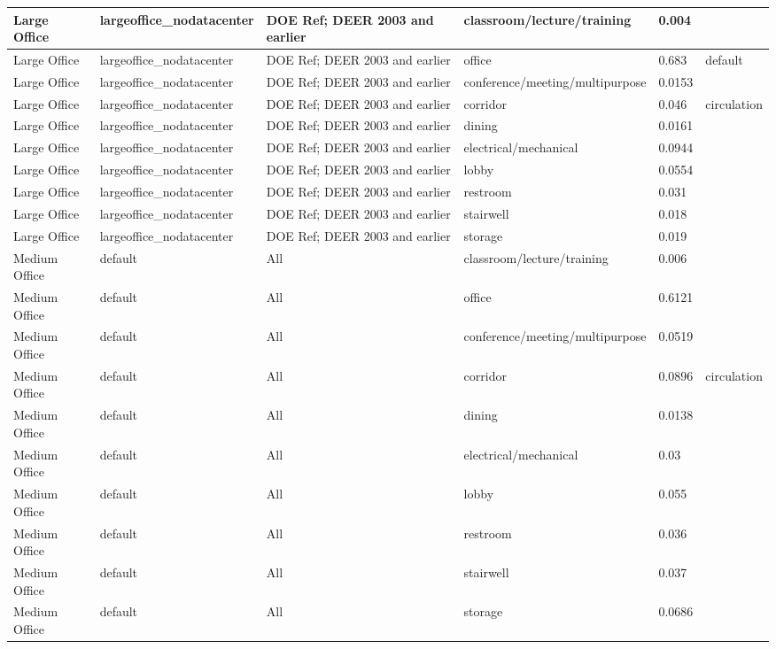 \begin{center}
\begin{longtable}{|p{1.0in}|p{1.05in}|p{1.1in}|p{1.9in}|p{0.55in}|p{0.95in}|}
Large Office & largeoffice\_nodatacenter & DOE Ref; DEER 2003 and earlier & classroom/lecture/training & 0.004 &  \\ \hline
Large Office & largeoffice\_nodatacenter & DOE Ref; DEER 2003 and earlier & office & 0.683 & default \\ \hline
Large Office & largeoffice\_nodatacenter & DOE Ref; DEER 2003 and earlier & conference/meeting/multipurpose & 0.0153 &  \\ \hline
Large Office & largeoffice\_nodatacenter & DOE Ref; DEER 2003 and earlier & corridor & 0.046 & circulation \\ \hline
Large Office & largeoffice\_nodatacenter & DOE Ref; DEER 2003 and earlier & dining & 0.0161 &  \\ \hline
Large Office & largeoffice\_nodatacenter & DOE Ref; DEER 2003 and earlier & electrical/mechanical & 0.0944 &  \\ \hline
Large Office & largeoffice\_nodatacenter & DOE Ref; DEER 2003 and earlier & lobby & 0.0554 &  \\ \hline
Large Office & largeoffice\_nodatacenter & DOE Ref; DEER 2003 and earlier & restroom & 0.031 &  \\ \hline
Large Office & largeoffice\_nodatacenter & DOE Ref; DEER 2003 and earlier & stairwell & 0.018 &  \\ \hline
Large Office & largeoffice\_nodatacenter & DOE Ref; DEER 2003 and earlier & storage & 0.019 &  \\ \hline
Medium Office & default & All & classroom/lecture/training & 0.006 &  \\ \hline
Medium Office & default & All & office & 0.6121 &  \\ \hline
Medium Office & default & All & conference/meeting/multipurpose & 0.0519 &  \\ \hline
Medium Office & default & All & corridor & 0.0896 & circulation \\ \hline
Medium Office & default & All & dining & 0.0138 &  \\ \hline
Medium Office & default & All & electrical/mechanical & 0.03 &  \\ \hline
Medium Office & default & All & lobby & 0.055 &  \\ \hline
Medium Office & default & All & restroom & 0.036 &  \\ \hline
Medium Office & default & All & stairwell & 0.037 &  \\ \hline
Medium Office & default & All & storage & 0.0686 &  \\ \hline

\end{longtable}
\end{center}
